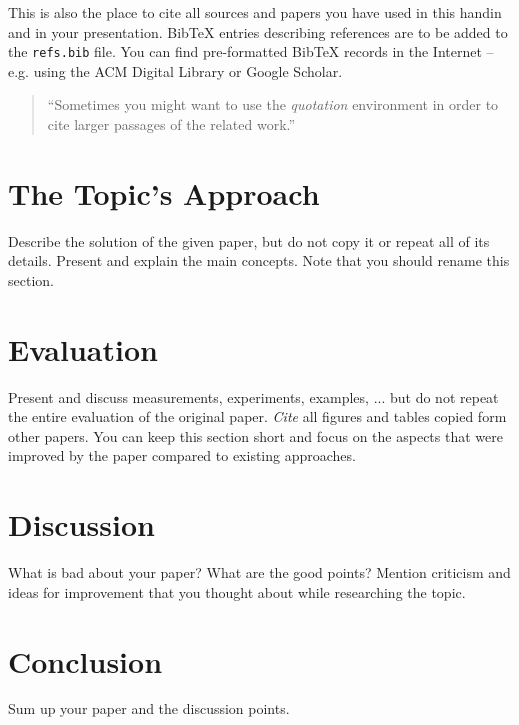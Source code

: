 \documentclass[a4paper,10pt,twoside]{article}
\begin{document}
This is also the place to cite all sources and papers you have used in this handin and in your presentation. 
Bib\TeX$\!$ entries describing references are to be added to the \verb|refs.bib| file. 
You can find pre-formatted Bib\TeX$\!$ records in the Internet -- e.g. using the ACM Digital Library or Google Scholar.

\begin{quotation}
	``Sometimes you might want to use the \emph{quotation} environment in order to cite larger passages of the related work.''
\end{quotation}

\section{The Topic's Approach}

Describe the solution of the given paper, but do not copy it or repeat all of its details.
Present and explain the main concepts. 
Note that you should rename this section.

\section{Evaluation}

Present and discuss measurements, experiments, examples, ... but do not repeat the entire evaluation of the original paper.
\emph{Cite} all figures and tables copied form other papers.
You can keep this section short and focus on the aspects that were improved by the paper compared to existing approaches.

\section{Discussion}

What is bad about your paper? 
What are the good points? 
Mention criticism and ideas for improvement that you thought about while researching the topic.

\section{Conclusion}

Sum up your paper and the discussion points.


 
\end{document}

